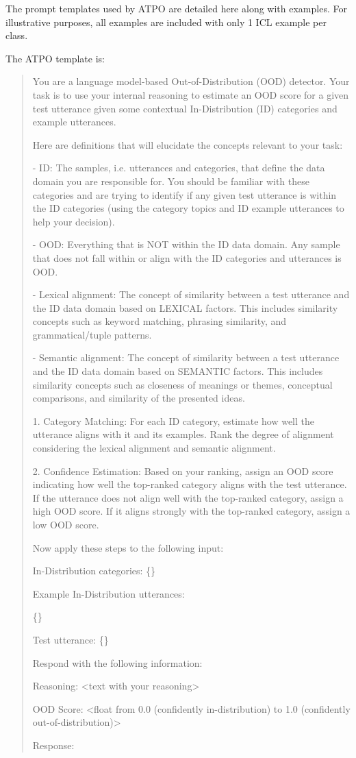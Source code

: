 The prompt templates used by ATPO are detailed here along with examples. For illustrative purposes, all examples are included with only 1 ICL example per class.

The ATPO template is:
\begin{quote}
You are a language model-based Out-of-Distribution (OOD) detector. Your task is to use your internal reasoning to estimate an OOD score for a given test utterance given some contextual In-Distribution (ID) categories and example utterances.

Here are definitions that will elucidate the concepts relevant to your task:

- ID: The samples, i.e. utterances and categories, that define the data domain you are responsible for. You should be familiar with these categories and are trying to identify if any given test utterance is within the ID categories (using the category topics and ID example utterances to help your decision).

- OOD: Everything that is NOT within the ID data domain. Any sample that does not fall within or align with the ID categories and utterances is OOD.

- Lexical alignment: The concept of similarity between a test utterance and the ID data domain based on LEXICAL factors. This includes similarity concepts such as keyword matching, phrasing similarity, and grammatical/tuple patterns.

- Semantic alignment: The concept of similarity between a test utterance and the ID data domain based on SEMANTIC factors. This includes similarity concepts such as closeness of meanings or themes, conceptual comparisons, and similarity of the presented ideas.

1. Category Matching: For each ID category, estimate how well the utterance aligns with it and its examples. Rank the degree of alignment considering the lexical alignment and semantic alignment.

2. Confidence Estimation: Based on your ranking, assign an OOD score indicating how well the top-ranked category aligns with the test utterance. If the utterance does not align well with the top-ranked category, assign a high OOD score. If it aligns strongly with the top-ranked category, assign a low OOD score.

Now apply these steps to the following input:

In-Distribution categories: \{\}

Example In-Distribution utterances:

\{\}

Test utterance: \{\}

Respond with the following information:

Reasoning: <text with your reasoning> 

OOD Score: <float from 0.0 (confidently in-distribution) to 1.0 (confidently out-of-distribution)>

Response:
\end{quote}
